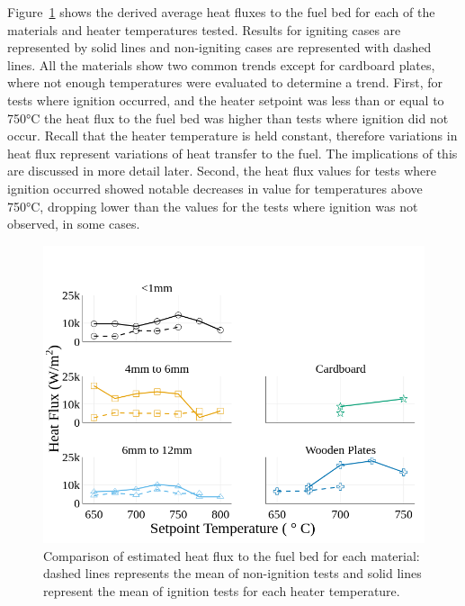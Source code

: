    Figure~\ref{fig:flux_comparison} shows the derived average heat fluxes to the fuel bed for each of the materials and heater temperatures tested. Results for igniting cases are represented by solid lines and non-igniting cases are represented with dashed lines. All the materials show two common trends except for cardboard plates, where not enough temperatures were evaluated to determine a trend. First, for tests where ignition occurred, and the heater setpoint was less than or equal to 750\si{\celsius} the heat flux to the fuel bed was higher than tests where ignition did not occur. Recall that the heater temperature is held constant, therefore variations in heat flux represent variations of heat transfer to the fuel. The implications of this are discussed in more detail later. Second, the heat flux values for tests where ignition occurred showed notable decreases in value for temperatures above 750\si{\celsius}, dropping lower than the values for the tests where ignition was not observed, in some cases.
        \begin{figure}[hbpt]
            \centering
            \includegraphics[width=\figureWidthSet]{Figures/power_comparison_trimmed.png}
            \caption{Comparison of estimated heat flux to the fuel bed for each material: dashed lines represents the mean of non-ignition tests and solid lines represent the mean of ignition tests for each heater temperature.}
            \label{fig:flux_comparison}
        \end{figure}
